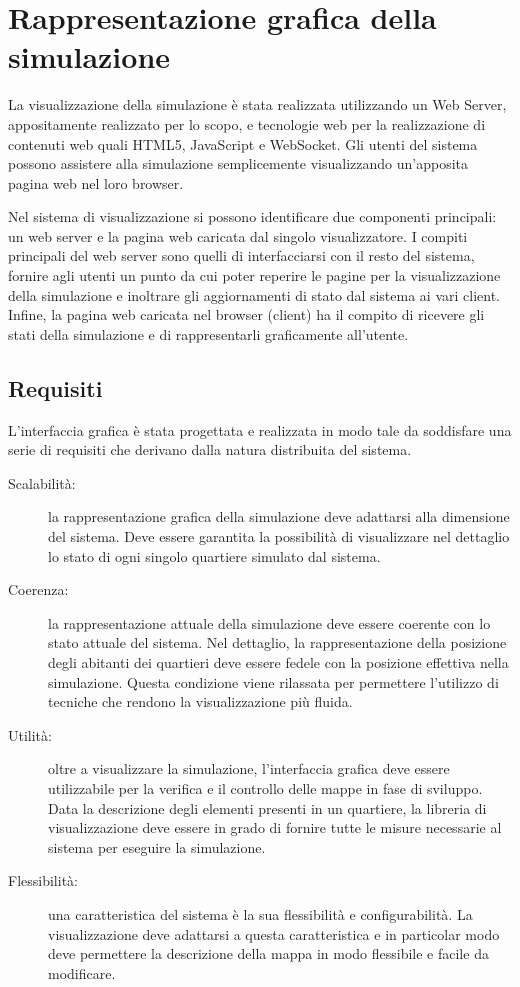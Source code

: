 \section{Rappresentazione grafica della simulazione}
La visualizzazione della simulazione è stata realizzata utilizzando un Web
Server, appositamente realizzato per lo scopo, e tecnologie web per la
realizzazione di contenuti web quali HTML5, JavaScript e WebSocket.
Gli utenti del sistema possono assistere alla simulazione semplicemente
visualizzando un'apposita pagina web nel loro browser.

Nel sistema di visualizzazione si possono identificare due componenti
principali: un web server e la pagina web caricata dal singolo visualizzatore.
I compiti principali del web server sono quelli di interfacciarsi con il resto
del sistema, fornire agli utenti un punto da cui poter reperire le pagine per la
visualizzazione della simulazione e inoltrare gli aggiornamenti di stato dal
sistema ai vari client.
Infine, la pagina web caricata nel browser (client) ha il compito di ricevere
gli stati della simulazione e di rappresentarli graficamente all'utente.

\subsection{Requisiti}\label{subsec:requisiti}
L'interfaccia grafica è stata progettata e realizzata in modo tale da
soddisfare una serie di requisiti che derivano dalla natura distribuita del
sistema. 

\begin{description}
	\item[Scalabilità:] la rappresentazione grafica della simulazione deve 
	adattarsi alla dimensione del sistema. Deve essere garantita la possibilità 
	di visualizzare nel dettaglio lo stato di ogni singolo quartiere simulato dal
	sistema.

	\item[Coerenza:] la rappresentazione attuale della simulazione deve essere
	coerente con lo stato attuale del sistema. Nel dettaglio, la rappresentazione
	della posizione degli abitanti dei quartieri deve essere fedele con la
	posizione effettiva nella simulazione. Questa condizione viene rilassata per
	permettere l'utilizzo di tecniche che rendono la visualizzazione più fluida.
	
	\item[Utilità:] oltre a visualizzare la simulazione, l'interfaccia grafica deve
	essere utilizzabile per la verifica e il controllo delle mappe in fase di
	sviluppo. Data la descrizione degli elementi presenti in un quartiere, la
	libreria di visualizzazione deve essere in grado di fornire tutte le misure
	necessarie al sistema per eseguire la simulazione.
	
	\item[Flessibilità:] una caratteristica del sistema è la sua flessibilità e
	configurabilità. La visualizzazione deve adattarsi a questa caratteristica e in
	particolar modo deve permettere la descrizione della mappa in modo flessibile e
	facile da modificare.
	
\end{description}


